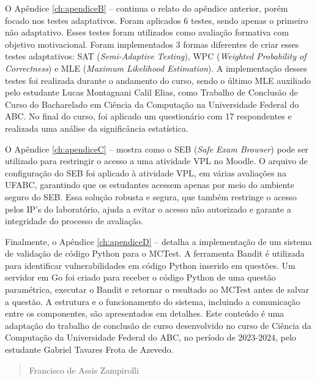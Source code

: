 O Apêndice \ref{ch:apendiceB} --  continua o relato do apêndice anterior, porém focado nos testes adaptativos. Foram aplicados 6 testes, sendo apenas o primeiro não adaptativo. Esses testes foram utilizados como avaliação formativa com objetivo motivacional. Foram implementados 3 formas diferentes de criar esses testes adaptativos: SAT (\textit{Semi-Adaptive Testing}), WPC (\textit{Weighted Probability of Correctness}) e MLE (\textit{Maximum Likelihood Estimation}). A implementação desses testes foi realizada durante o andamento do curso, sendo o último MLE auxiliado pelo estudante Lucas Montagnani Calil Elias, como Trabalho de Conclusão de Curso do Bacharelado em Ciência da Computação na Universidade Federal do ABC. No final do curso, foi aplicado um questionário com 17 respondentes e realizada uma análise da significância estatística.

O Apêndice \ref{ch:apendiceC} --  mostra como o SEB (\textit{Safe Exam Browser}) pode ser utilizado para restringir o acesso a uma atividade VPL no Moodle. O arquivo de configuração do SEB foi aplicado à atividade VPL, em várias avaliações na UFABC, garantindo que os estudantes acessem apenas por meio do ambiente seguro do SEB. Essa solução robusta e segura, que também restringe o acesso pelos IP's do laboratório, ajuda a evitar o acesso não autorizado e garante a integridade do processo de avaliação.

Finalmente, o Apêndice \ref{ch:apendiceD} --  detalha a implementação de um sistema de validação de código Python para o MCTest. A ferramenta Bandit é utilizada para identificar vulnerabilidades em código Python inserido em questões. Um servidor em Go foi criado para receber o código Python de uma questão paramétrica, executar o Bandit e retornar o resultado ao MCTest antes de salvar a questão. A estrutura e o funcionamento do sistema, incluindo a comunicação entre os componentes, são apresentados em detalhes. Este conteúdo é uma adaptação do trabalho de conclusão de curso desenvolvido no curso de Ciência da Computação da Universidade Federal do ABC, no período de 2023-2024, pelo estudante Gabriel Tavares Frota de Azevedo.

\begin{verse}
    \vspace*{2mm}
	\begin{flushright}
		Francisco de Assis Zampirolli\\
            \date{\today}
	\end{flushright}
\end{verse}
